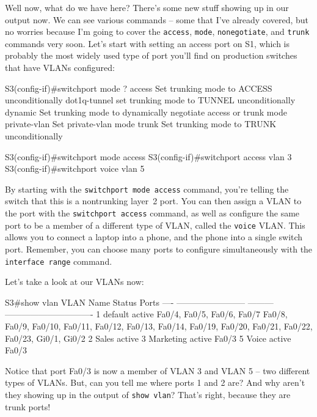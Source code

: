 \documentclass[b5paper,11pt]{memoir}
\begin{document}
Well now, what do we have here? There's some new stuff showing up in our
output now. We can see various commands -- some that I've already
covered, but no worries because I'm going to cover the \texttt{access},
\texttt{mode}, \texttt{nonegotiate}, and \texttt{trunk} commands very
soon. Let's start with setting an access port on S1, which is probably
the most widely used type of port you'll find on production switches
that have VLANs configured:

\begin{cli}
S3(config-if)#switchport mode ?
  access        Set trunking mode to ACCESS unconditionally
  dot1q-tunnel  set trunking mode to TUNNEL unconditionally
  dynamic       Set trunking mode to dynamically negotiate access or trunk mode
  private-vlan  Set private-vlan mode
  trunk         Set trunking mode to TRUNK unconditionally

S3(config-if)#switchport mode access
S3(config-if)#switchport access vlan 3
S3(config-if)#switchport voice vlan 5
\end{cli}

By starting with the \texttt{switchport\ mode\ access} command, you're
telling the switch that this is a nontrunking layer~2 port. You can then
assign a VLAN to the port with the \texttt{switchport\ access} command,
as well as configure the same port to be a member of a different type of
VLAN, called the \texttt{voice} VLAN. This allows you to connect a
laptop into a phone, and the phone into a single switch port. Remember,
you can choose many ports to configure simultaneously with the
\texttt{interface\ range} command.

Let's take a look at our VLANs now:

\begin{cli}
S3#show vlan
VLAN Name                       Status    Ports
---- ------------------------ --------- -------------------------------
1    default                   active     Fa0/4, Fa0/5, Fa0/6, Fa0/7
                                          Fa0/8, Fa0/9, Fa0/10, Fa0/11,
                                          Fa0/12, Fa0/13, Fa0/14, Fa0/19,
                                          Fa0/20, Fa0/21, Fa0/22, Fa0/23,
                                          Gi0/1, Gi0/2
2    Sales                     active
3    Marketing                 active    Fa0/3
5    Voice                     active    Fa0/3
\end{cli}

Notice that port Fa0/3 is now a member of VLAN 3 and VLAN 5 -- two different types of VLANs.
But, can you tell me where ports 1 and 2 are?
And why aren't they showing up in the output of \texttt{show\ vlan}?
That's right, because they are trunk ports!
\end{document}
